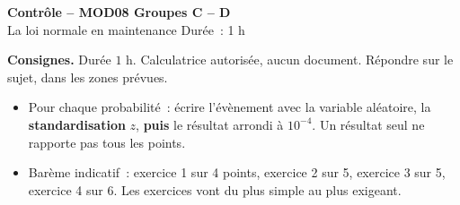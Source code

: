 \documentclass[a4paper,11pt]{article}
\newcommand{\GRP}{C -- D}
\begin{document}
\begin{tcolorbox}[colback=uimmred, colframe=uimmred, sharp corners, boxrule=0pt,
  left=14pt, right=14pt, top=8pt, bottom=8pt]
{\color{white}\LARGE\bfseries Contrôle -- MOD08 \hfill Groupes \GRP}\\[3pt]
{\color{white}\large La loi normale en maintenance \hfill Durée~: 1 h}
\end{tcolorbox}

\vspace{2pt}

\begin{consigne}\small
\textbf{Consignes.} Durée $1$ h. Calculatrice autorisée, aucun document. Répondre sur le sujet, dans les zones prévues.
\begin{itemize}[leftmargin=12pt, itemsep=0pt, topsep=2pt]
  \item Pour chaque probabilité~: écrire l'évènement avec la variable aléatoire, la \textbf{standardisation} $z$, \textbf{puis} le résultat arrondi à $10^{-4}$. Un résultat seul ne rapporte pas tous les points.
  \item Barème indicatif~: exercice 1 sur 4 points, exercice 2 sur 5, exercice 3 sur 5, exercice 4 sur 6. Les exercices vont du plus simple au plus exigeant.
\end{itemize}
\end{consigne}
\end{document}

